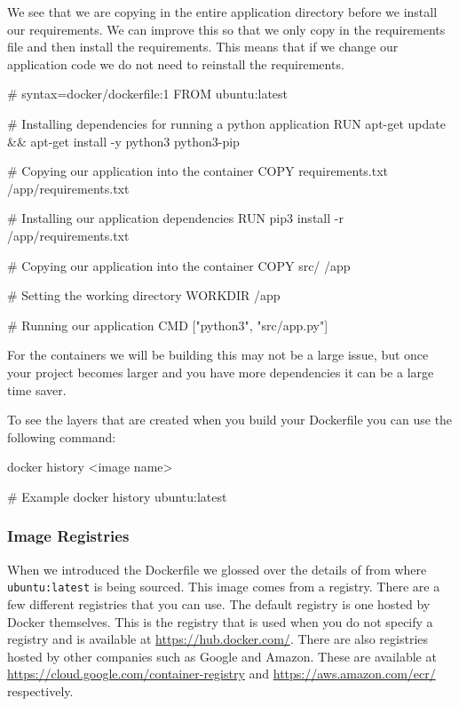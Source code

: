 \documentclass{csse4400}
\begin{document}
We see that we are copying in the entire application directory before we install our requirements. We can improve this so that we only copy in the requirements file and then install the requirements. This means that if we change our application code we do not need to reinstall the requirements.

\begin{code}[language=docker,numbers=none]{}
  # syntax=docker/dockerfile:1
  FROM ubuntu:latest

  # Installing dependencies for running a python application
  RUN apt-get update && apt-get install -y python3 python3-pip

  # Copying our application into the container
  COPY requirements.txt /app/requirements.txt

  # Installing our application dependencies
  RUN pip3 install -r /app/requirements.txt

  # Copying our application into the container
  COPY src/ /app

  # Setting the working directory
  WORKDIR /app

  # Running our application
  CMD ["python3", "src/app.py"]
\end{code}

For the containers we will be building this may not be a large issue, but once your project becomes larger and you have more dependencies it can be a large time saver.

To see the layers that are created when you build your Dockerfile you can use the following command:

\begin{code}[language=bash,numbers=none]{}
  docker history <image name>

  # Example
  docker history ubuntu:latest
\end{code}


\subsubsection{Image Registries}

When we introduced the Dockerfile we glossed over the details of from where \texttt{ubuntu:latest} is being sourced. This image comes from a registry. There are a few different registries that you can use. The default registry is one hosted by Docker themselves. This is the registry that is used when you do not specify a registry and is available at \url{https://hub.docker.com/}. There are also registries hosted by other companies such as Google and Amazon. These are available at \url{https://cloud.google.com/container-registry} and \url{https://aws.amazon.com/ecr/} respectively.
\end{document}
